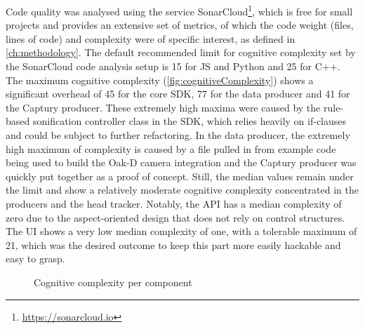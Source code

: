 Code quality was analysed using the service SonarCloud\footnote{\url{https://sonarcloud.io}}, which is free for small projects and provides an extensive set of metrics, of which the code weight (files, lines of code) and complexity were of specific interest, as defined in \autoref{ch:methodology}.
The default recommended limit for cognitive complexity set by the SonarCloud code analysis setup is 15 for \ac{JS} and Python and 25 for C++.
The maximum cognitive complexity (\autoref{fig:cognitiveComplexity}) shows a significant overhead of 45 for the core \ac{SDK}, 77 for the data producer and 41 for the Captury producer.
These extremely high maxima were caused by the rule-based sonification controller class in the \ac{SDK}, which relies heavily on if-clauses and could be subject to further refactoring.
In the data producer, the extremely high maximum of complexity is caused by a file pulled in from example code being used to build the Oak-D camera integration and the Captury producer was quickly put together as a proof of concept.
Still, the median values remain under the limit and show a relatively moderate cognitive complexity concentrated in the producers and the head tracker.
Notably, the \ac{API} has a median complexity of zero due to the aspect-oriented design that does not rely on control structures.
The \ac{UI} shows a very low median complexity of one, with a tolerable maximum of 21, which was the desired outcome to keep this part more easily hackable and easy to grasp.

\begin{figure}[!ht]
\centering

\caption[Cognitive complexity]{Cognitive complexity per component\protect}
\label{fig:cognitiveComplexity}
\end{figure}

